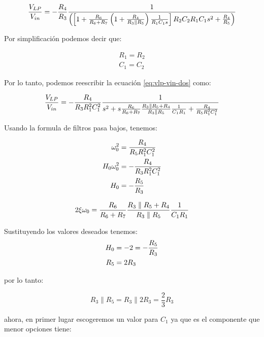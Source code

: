 \begin{equation}
    \frac{V_{LP}}{V_{in}} = - \frac{R_4}{R_3}\frac{1}{\left( \left[ 1 + \frac{R_6}{R_6 + R_7} \left( 1 + \frac{R_4}{R_3 \parallel R_5} \right)\frac{1}{R_1 C_1 s} \right] R_2 C_2 R_1 C_1 s^2 + \frac{R_4}{R_5} \right)}
    \label{eq:vlp-vin-dos}
\end{equation}

Por simplificación podemos decir que:

\begin{align*}
    R_1 = R_2 \\
    C_1 = C_2
\end{align*}

Por lo tanto, podemos reescribir la ecuación \ref{eq:vlp-vin-dos} como:


\begin{equation}
    \frac{V_{LP}}{V_{in}} = - \frac{R_4}{R_3 R_1^2 C_1^2} \frac{1}{s^2 + s \frac{R_6}{R_6 + R_7} \frac{R_3 \parallel R_5 + R_4}{R_3 \parallel R_5} \frac{1}{C_1 R_1} + \frac{R_4}{R_5 R_1^2 C_1^2}}
\end{equation}

Usando la formula de filtros pasa bajos, tenemos:

\begin{align}
    \omega_0^2 &= \frac{R_4}{R_5 R_1^2 C_1^2} \label{eq:freq-corte-variable-de-estado} \\
    H_0\omega_0^2 &= - \frac{R_4}{R_3 R_1^2 C_1^2} \label{eq:howo-sqt-variable-de-estado} \\
    H_0 &= -\frac{R_5}{R_3} \label{eq:ganancia-filtro-variable-de-estado}
\end{align}

\begin{equation}
    2\xi\omega_0 = \frac{R_6}{R_6 + R_7} \frac{R_3 \parallel R_5 + R_4}{R_3 \parallel R_5} \frac{1}{C_1 R_1} 
    \label{eq:factor-amortiguamiento-variable-de-estado}
\end{equation}

Sustituyendo los valores deseados tenemos:
\begin{align*}
    H_0 &= -2 = -\frac{R_5}{R_3} \\
    R_5 &= 2 R_3 \\
\end{align*}

por lo tanto:

$$ R_3 \parallel R_5 = R_3 \parallel 2 R_3 = \frac{2}{3}R_3 $$

ahora, en primer lugar escogeremos un valor para $C_1$ ya que es el componente que menor opciones tiene:

